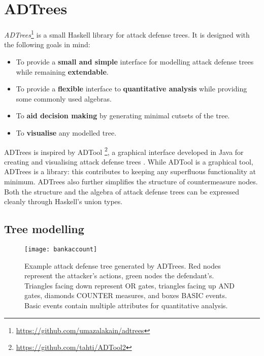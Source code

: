 \documentclass{scrreprt}
\begin{document}


\section{ADTrees}

\textit{ADTrees}\footnote{\url{https://github.com/umazalakain/adtrees}}
is a small Haskell library for attack defense trees. It is designed with the
following goals in mind:

\begin{itemize}
    \item To provide a \textbf{small and simple} interface for modelling attack
        defense trees while remaining \textbf{extendable}. 
    \item To provide a \textbf{flexible} interface to \textbf{quantitative
        analysis} while providing some commonly used algebras.
    \item To \textbf{aid decision making} by generating minimal cutsets of the
        tree.
    \item To \textbf{visualise} any modelled tree.
\end{itemize}

ADTrees is inspired by ADTool \footnote{\url{https://github.com/tahti/ADTool2}},
a graphical interface developed in Java for creating and visualising attack
defense trees \cite{KordyTool}. While ADTool is a graphical tool, ADTrees is a
library: this contributes to keeping any superfluous functionality at minimum.
ADTrees also further simplifies the structure of countermeasure nodes. Both the
structure and the algebra of attack defense trees can be expressed cleanly
through Haskell's union types.

\subsection{Tree modelling}

\begin{figure}[h!]
    \label{example-adt}
    \centering
    \texttt{[image: bankaccount]}
    \caption{Example attack defense tree generated by ADTrees. Red nodes
    represent the attacker's actions, green nodes the defendant's. Triangles
    facing down represent OR gates, triangles facing up AND gates, diamonds
    COUNTER measures, and boxes BASIC events.  Basic events contain multiple
    attributes for quantitative analysis.}
\end{figure}
\end{document}
